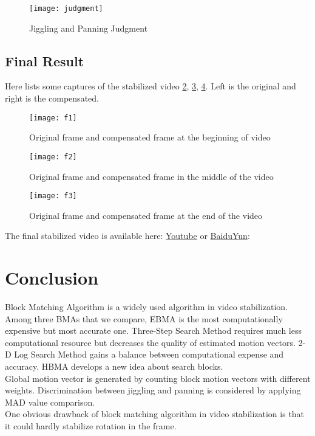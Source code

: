 \documentclass[a4paper, twocolumn]{article}
\begin{document}
	 \begin{figure}[h]
	\centering
	\texttt{[image: judgment]}
	\caption{Jiggling and Panning Judgment}
	\label{fig:judgment}
	\end{figure}
	
	\subsection{Final Result}
	Here lists some captures of the stabilized video \ref{fig:f1}, \ref{fig:f2}, \ref{fig:f3}. Left is the original and right is the compensated.
	
	\begin{figure}[h]
	\centering
	\texttt{[image: f1]}
	\caption{Original frame and compensated frame at the beginning of video}
	\label{fig:f1}
	\end{figure}
	\begin{figure}[h]
	\centering
	\texttt{[image: f2]}
	\caption{Original frame and compensated frame in the middle of the video}
	\label{fig:f2}
	\end{figure}
	\begin{figure}[h]
	\centering
	\texttt{[image: f3]}
	\caption{Original frame and compensated frame at the end of the video}
	\label{fig:f3}
	\end{figure}
	
	\noindent
	The final stabilized video is available here: \href{https://youtu.be/YMaCjQ8-WY0}{Youtube} or \href{http://pan.baidu.com/s/1bGrkvW}{BaiduYun}: 

	
	\section{Conclusion}
	Block Matching Algorithm is a widely used algorithm in video stabilization. Among three BMAs that we compare, EBMA is the most computationally expensive but most accurate one. Three-Step Search Method requires much less computational resource but decreases the quality of estimated motion vectors. 2-D Log Search Method gains a balance between computational expense and accuracy. HBMA develops a new idea about search blocks. \\
	Global motion vector is generated by counting block motion vectors with different weights. Discrimination between jiggling and panning is considered by applying MAD value comparison. \\
	One obvious drawback of block matching algorithm in video stabilization is that it could hardly stabilize rotation in the frame.
	
\end{document}
